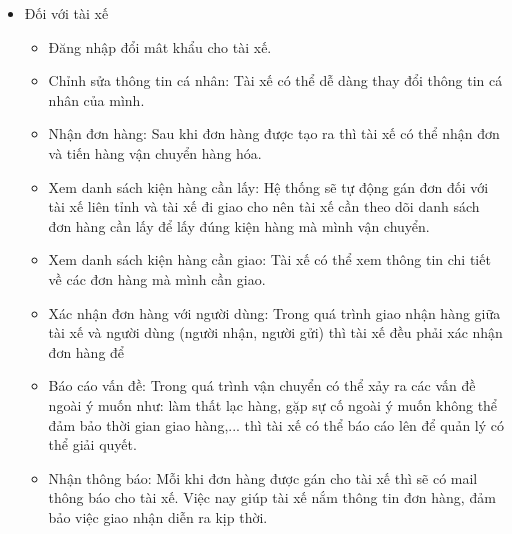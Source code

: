 \begin{itemize}
\begin{itemize}
				    \end{itemize}
				
			         
				\item Đối với tài xế
	                \begin{itemize}
	                    \item Đăng nhập đổi mât khẩu cho tài xế.
	                    \item Chỉnh sửa thông tin cá nhân: Tài xế có thể dễ dàng thay đổi thông tin cá nhân của mình.
	                    \item Nhận đơn hàng: Sau khi đơn hàng được tạo ra thì tài xế có thể nhận đơn và tiến hàng vận chuyển hàng hóa.
	                    \item Xem danh sách kiện hàng cần lấy: Hệ thống sẽ tự động gán đơn đối với tài xế liên tỉnh và tài xế đi giao cho nên tài xế cần theo dõi danh sách đơn hàng cần lấy để lấy đúng kiện hàng mà mình vận chuyển.
	                    \item Xem danh sách kiện hàng cần giao: Tài xế có thể xem thông tin chi tiết về các đơn hàng mà mình cần giao.
	                    \item Xác nhận đơn hàng với người dùng: Trong quá trình giao nhận hàng giữa tài xế và người dùng (người nhận, người gửi) thì tài xế đều phải xác nhận đơn hàng để 
	                    \item Báo cáo vấn đề: Trong quá trình vận chuyển có thể xảy ra các vấn đề ngoài ý muốn như: làm thất lạc hàng, gặp sự cố ngoài ý muốn không thể đảm bảo thời gian giao hàng,... thì tài xế có thể báo cáo lên để quản lý có thể giải quyết.
	                    \item Nhận thông báo: Mỗi khi đơn hàng được gán cho tài xế thì sẽ có mail thông báo cho tài xế. Việc nay giúp tài xế nắm thông tin đơn hàng, đảm bảo việc giao nhận diễn ra kịp thời.
	                \end{itemize}
	                

\end{itemize}
